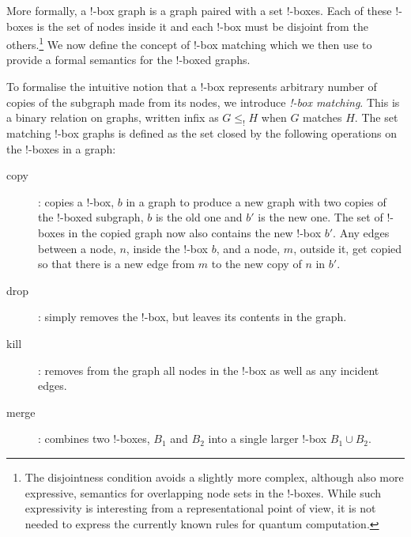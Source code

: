 \documentclass[runningheads]{llncs}
\newcommand{\inlinegraphic}[2]{
  \dimendef\grafheight=255\dimendef\grafvshift=254
  \grafheight=#1
  \grafvshift=-0.5\grafheight
  \advance\grafvshift by 0.5ex
  \raisebox{\grafvshift}{\texttt{[image: images/\#2]}\xspace}
}
\begin{document}



More formally, a !-box graph is a graph paired with a set !-boxes. Each
of these !-boxes is the set of nodes inside it and each !-box must be
disjoint from the others.\footnote{The disjointness condition avoids a
  slightly more complex, although also more expressive, semantics for
  overlapping node sets in the !-boxes. While such expressivity is
  interesting from a representational point of view, it is not needed
  to express the currently known rules for quantum computation.}  We
now define the concept of !-box matching which we then use to provide
a formal semantics for the !-boxed graphs.

To formalise the intuitive notion that a !-box
represents arbitrary number of copies of the subgraph made from its
nodes, we introduce \emph{!-box matching}. This is a binary relation
on graphs, written infix as $G \leq_! H$ when $G$ matches $H$. The set
matching !-box graphs is defined as the set closed by the following
operations on the !-boxes in a graph:

\begin{description}
  \item[copy]: copies a !-box, $b$ in a graph to produce a new graph
  with two copies of the !-boxed subgraph, $b$ is the old one and $b'$
  is the new one. The set of !-boxes in the copied graph now also
  contains the new !-box $b'$. Any edges between a node, $n$, inside
  the !-box $b$, and a node, $m$, outside it, get copied so that there
  is a new edge from $m$ to the new copy of $n$ in $b'$.

\item[drop]: simply removes the !-box, but leaves its contents in the
  graph.

\item[kill]: removes from the graph all nodes in the !-box as well as
  any incident edges.

\item[merge]: combines two !-boxes, $B_1$ and $B_2$ into a single
  larger !-box $B_1 \cup B_2$.
\end{description}
\end{document}

